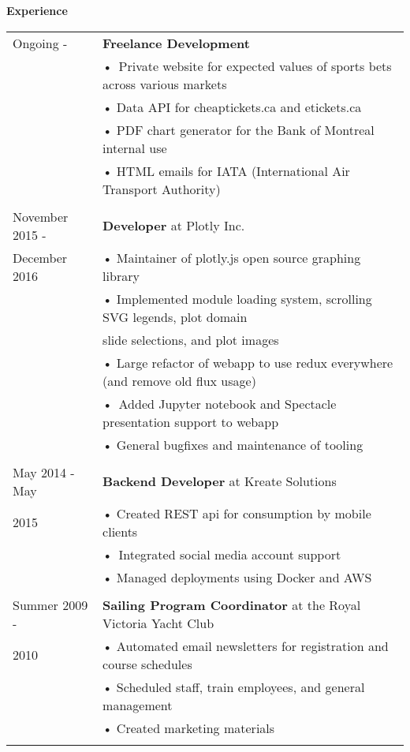 \documentclass[notitlepage,oneside,draft]{article}
\begin{document}
\begin{flushleft}
  \large
  \textbf{Experience} \\
  \vspace{12pt}
  \normalsize
  \begin{tabular}{ p{86pt} | l}
    Ongoing - & \textbf{Freelance Development} \\
    & • Private website for expected values of sports bets across various markets \\
    & • Data API for cheaptickets.ca and etickets.ca \\
    & • PDF chart generator for the Bank of Montreal internal use \\
    & • HTML emails for IATA (International Air Transport Authority) \\
    & \\
    November 2015 - & \textbf{Developer} at Plotly Inc. \\
    December 2016 & • Maintainer of plotly.js open source graphing library \\
    & • Implemented module loading system, scrolling SVG legends, plot domain \\
    & \hspace{5pt} slide selections, and plot images \\
    & • Large refactor of webapp to use redux everywhere (and remove old flux usage) \\
    & • Added Jupyter notebook and Spectacle presentation support to webapp \\
    & • General bugfixes and maintenance of tooling \\
    & \\
    May 2014 - May & \textbf{Backend Developer} at Kreate Solutions \\
    2015 & • Created REST api for consumption by mobile clients \\
    & • Integrated social media account support \\
    & • Managed deployments using Docker and AWS \\
    & \\
    Summer 2009 - & \textbf{Sailing Program Coordinator} at the Royal Victoria Yacht Club \\
    2010 & • Automated email newsletters for registration and course schedules \\
    & • Scheduled staff, train employees, and general management \\
    & • Created marketing materials \\
    & \\
  \end{tabular}
  \vspace{24pt}



\end{flushleft}
\end{document}
